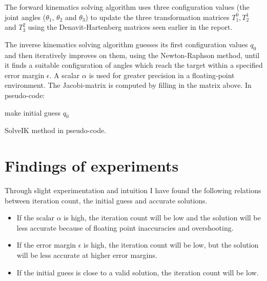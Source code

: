 \documentclass{article}
\begin{document}
The forward kinematics solving algorithm uses three configuration values (the joint angles (\(\theta_1\), \(\theta_2\) and \(\theta_3\)) to update the three transformation matrices \(T_1^0, T_2^1\) and \( T_3^2\) using the Denavit-Hartenberg matrices seen earlier in the report.\\\newpage

The inverse kinematics solving algorithm guesses its first configuration values \(q_0\) and then iteratively improves on them, using the Newton-Raphson method, until it finds a suitable configuration of angles which reach the target within a specified error margin \(\epsilon\). A scalar \(\alpha\) is used for greater precision in a floating-point environment. The Jacobi-matrix is computed by filling in the matrix above. In pseudo-code:\\
\begin{algorithm}[H]
 make initial guess \(q_0\)\;
 \caption{SolveIK method in pseudo-code.}
\end{algorithm}

\section{Findings of experiments}

Through slight experimentation and intuition I have found the following relations between iteration count, the initial guess and accurate solutions.

\begin{itemize}
\item{If the scalar \(\alpha\) is high, the iteration count will be low and the solution will be less accurate because of floating point inaccuracies and overshooting.}
\item{If the error margin \(\epsilon\) is high, the iteration count will be low, but the solution will be less accurate at higher error margins.}
\item{If the initial guess is close to a valid solution, the iteration count will be low.}
\end{itemize}
\end{document}

